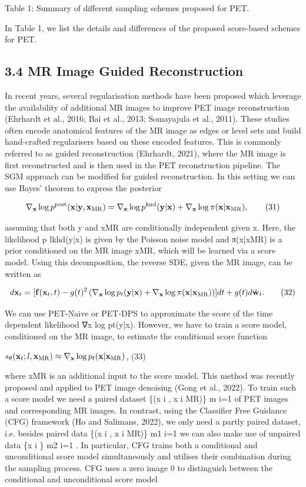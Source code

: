 \documentclass{article}
\begin{document}
Table 1: Summary of different sampling schemes proposed for PET.

In Table 1, we list the details and differences of the proposed score-based schemes for PET.

\subsection{3.4 MR Image Guided Reconstruction}

In recent years, several regularisation methods have been proposed which leverage the availability of additional MR images to improve PET image reconstruction (Ehrhardt et al., 2016; Bai et al., 2013; Somayajula et al., 2011). These studies often encode anatomical features of the MR image as edges or level sets and build hand-crafted regularisers based on these encoded features. This is commonly referred to as guided reconstruction (Ehrhardt, 2021), where the MR image is first reconstructed and is then used in the PET reconstruction pipeline. The SGM approach can be modified for guided reconstruction. In this setting we can use Bayes' theorem to express the posterior

$$\nabla_{\bf x}\log p^{\rm post}({\bf x}|{\bf y},{\bf x}_{\rm MR})=\nabla_{\bf x}\log p^{\rm knd}({\bf y}|{\bf x})+\nabla_{\bf x}\log\pi({\bf x}|{\bf x}_{\rm MR}),\tag{31}$$

assuming that both y and xMR are conditionally independent given x. Here, the likelihood p lkhd(y|x) is given by the Poisson noise model and π(x|xMR) is a prior conditioned on the MR image xMR, which will be learned via a score model. Using this decomposition, the reverse SDE, given the MR image, can be written as

$$d{\bf x}_{t}=[{\bf f}({\bf x}_{t},t)-g(t)^{2}\left(\nabla_{\bf x}\log p_{t}({\bf y}|{\bf x})+\nabla_{\bf x}\log\pi({\bf x}|{\bf x}_{\rm MR})\right)]dt+g(t)d\tilde{\bf w}_{t}.\tag{32}$$

We can use PET-Naive or PET-DPS to approximate the score of the time dependent likelihood ∇x log pt(y|x). However, we have to train a score model, conditioned on the MR image, to estimate the conditional score function

$s_{\theta}({\bf x}_{t};l,{\bf x}_{\rm MR})\approx\nabla_{\bf x}\log p_{t}({\bf x}|{\bf x}_{\rm MR})$, (33)

where xMR is an additional input to the score model. This method was recently proposed and applied to PET image denoising (Gong et al., 2022). To train such a score model we need a paired dataset \{(x i , x i MR)\} m i=1 of PET images and corresponding MR images. In contrast, using the Classifier Free Guidance (CFG) framework (Ho and Salimans, 2022), we only need a partly paired dataset, i.e. besides paired data \{(x i , x i MR)\} m1 i=1 we can also make use of unpaired data \{x i \} m2 i=1 . In particular, CFG trains both a conditional and unconditional score model simultaneously and utilises their combination during the sampling process. CFG uses a zero image 0 to distinguish between the conditional and unconditional score model
\end{document}

